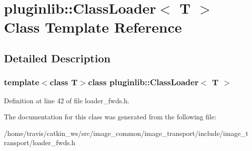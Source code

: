 \hypertarget{classpluginlib_1_1_class_loader}{\section{pluginlib\-:\-:Class\-Loader$<$ T $>$ Class Template Reference}
\label{classpluginlib_1_1_class_loader}
}


\subsection{Detailed Description}
\subsubsection*{template$<$class T$>$class pluginlib\-::\-Class\-Loader$<$ T $>$}



Definition at line 42 of file loader\-\_\-fwds.\-h.



The documentation for this class was generated from the following file\-:\begin{DoxyCompactItemize}
\item 
/home/travis/catkin\-\_\-ws/src/image\-\_\-common/image\-\_\-transport/include/image\-\_\-transport/loader\-\_\-fwds.\-h\end{DoxyCompactItemize}
